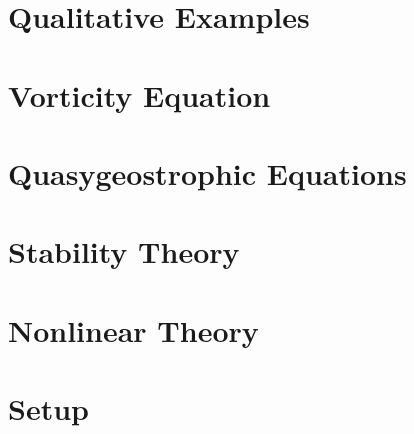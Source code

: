 \section{Qualitative Examples}
\label{s:examples}
\section{Vorticity Equation}
\label{s:vorticity}
\section{Quasygeostrophic Equations}
\label{s:qg}
\section{Stability Theory}
\label{s:stability}
\section{Nonlinear Theory}
\label{s:nonlinear}
\section{Setup}
\label{s:setup}
